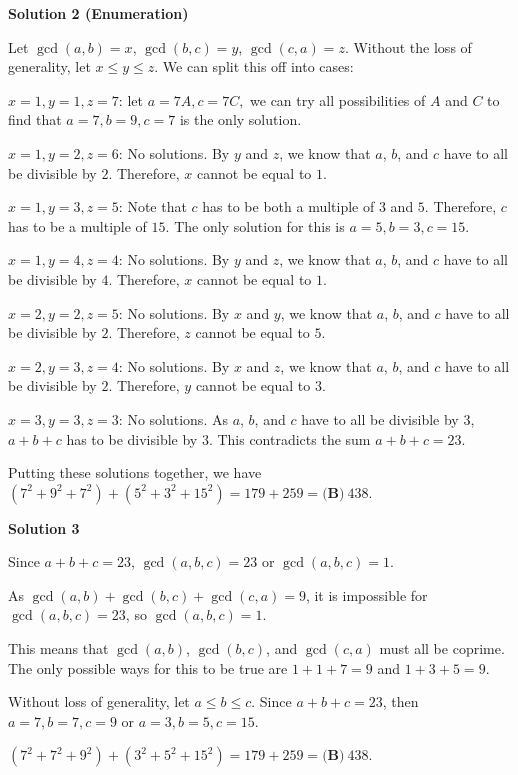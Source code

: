 \begin{enumerate}
\textbf{Solution 2 (Enumeration)}

Let $\gcd(a,b)=x$, $\gcd(b,c)=y$, $\gcd(c,a)=z$. Without the loss of generality, let $x \le y \le z$. We can split this off into cases: 

 $x=1,y=1,z=7$: let $a=7A, c=7C,$ we can try all possibilities of $A$ and $C$ to find that $a=7, b=9, c=7$ is the only solution. 

 $x=1,y=2,z=6$: No solutions. By $y$ and $z$, we know that $a$, $b$, and $c$ have to all be divisible by $2$. Therefore, $x$ cannot be equal to $1$. 

 $x=1,y=3,z=5$: Note that $c$ has to be both a multiple of $3$ and $5$. Therefore, $c$ has to be a multiple of $15$. The only solution for this is $a=5, b=3, c=15$. 

 $x=1,y=4,z=4$: No solutions. By $y$ and $z$, we know that $a$, $b$, and $c$ have to all be divisible by $4$. Therefore, $x$ cannot be equal to $1$. 

 $x=2,y=2,z=5$: No solutions. By $x$ and $y$, we know that $a$, $b$, and $c$ have to all be divisible by $2$. Therefore, $z$ cannot be equal to $5$. 

 $x=2,y=3,z=4$: No solutions. By $x$ and $z$, we know that $a$, $b$, and $c$ have to all be divisible by $2$. Therefore, $y$ cannot be equal to $3$. 

 $x=3,y=3,z=3$: No solutions. As $a$, $b$, and $c$ have to all be divisible by $3$, $a+b+c$ has to be divisible by $3$. This contradicts the sum $a+b+c=23$. 

 Putting these solutions together, we have $(7^2+9^2+7^2)+(5^2+3^2+15^2)=179+259=\boxed{\textbf{(B)} \: 438}$.

 



\textbf{Solution 3}

Since $a+b+c=23$, $\gcd(a,b,c)=23$ or $\gcd(a,b,c)=1$.

 As $\gcd(a,b)+\gcd(b,c)+\gcd(c,a)=9$, it is impossible for $\gcd(a,b,c)=23$, so $\gcd(a,b,c)=1$.

 This means that $\gcd(a,b)$, $\gcd(b,c)$, and $\gcd(c,a)$ must all be coprime. The only possible ways for this to be true are $1+1+7=9$ and $1+3+5=9$.

 Without loss of generality, let $a\le b\le c$. Since $a+b+c=23$, then $a=7, b=7, c=9$ or $a=3, b=5, c=15$.

 $(7^2+7^2+9^2)+(3^2+5^2+15^2)=179+259=\boxed{\textbf{(B)} \: 438}$.

 



\end{enumerate}
